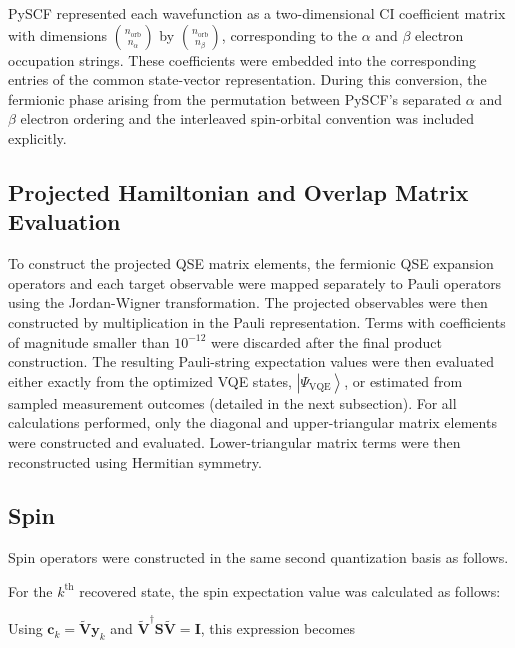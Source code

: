 PySCF represented each wavefunction as a two-dimensional CI coefficient matrix with dimensions $\binom{n_{\mathrm{orb}}}{n_{\alpha}}$ by $\binom{n_{\mathrm{orb}}}{n_{\beta}}$, corresponding to the $\alpha$ and $\beta$ electron occupation strings. These coefficients were embedded into the corresponding entries of the common state-vector representation. During this conversion, the fermionic phase arising from the permutation between PySCF's separated $\alpha$ and $\beta$ electron ordering and the interleaved spin-orbital convention was included explicitly.


\subsection{Projected Hamiltonian and Overlap Matrix Evaluation}
\label{sec:si-projected-matrices}
To construct the projected QSE matrix elements, the fermionic QSE expansion operators and each target observable were mapped separately to Pauli operators using the Jordan-Wigner transformation. 
The projected observables were then constructed by multiplication in the Pauli representation. 
Terms with coefficients of magnitude smaller than $10^{-12}$ were discarded after the final product construction. 
The resulting Pauli-string expectation values were then evaluated either exactly from the optimized VQE states, $\left|\Psi_{\mathrm{VQE}}\right\rangle$, or estimated from sampled measurement outcomes (detailed in the next subsection).
For all calculations performed, only the diagonal and upper-triangular matrix elements were constructed and evaluated. Lower-triangular matrix terms were then reconstructed using Hermitian symmetry.

\subsection{Spin}
\label{sec:si-spin-expectation}
Spin operators were constructed in the same second quantization basis as follows.

\SpinZEquation
\SpinLadderOperatorsEquation
\SpinSquaredEquation

For the $k^\mathrm{th}$ recovered state, the spin expectation value was calculated as follows:

\SpinExpectationQSEBasisEquation

Using $\mathbf{c}_k=\tilde{\mathbf{V}}\mathbf{y}_k$ and
$\tilde{\mathbf{V}}^{\dagger}\mathbf{S}\tilde{\mathbf{V}}=\mathbf{I}$, this
expression becomes

